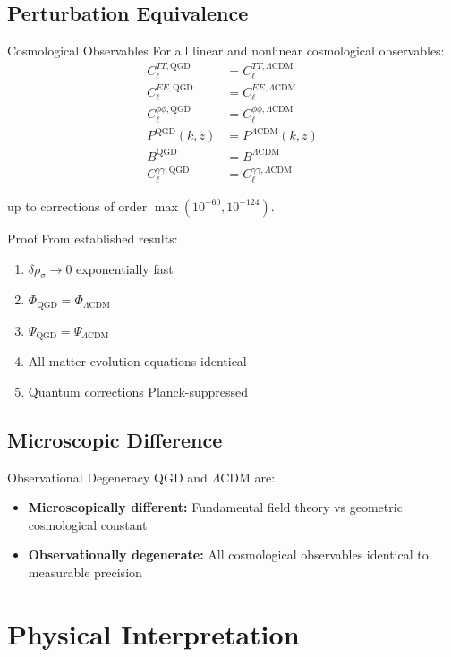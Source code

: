 \documentclass[11pt,a4paper]{article}
\theoremstyle{definition}
\theoremstyle{remark}
\begin{document}
	\subsection{Perturbation Equivalence}
	
	Cosmological Observables
		For all linear and nonlinear cosmological observables:
		\begin{align}
			C_\ell^{TT, \text{QGD}} &= C_\ell^{TT, \Lambda\text{CDM}}\\
			C_\ell^{EE, \text{QGD}} &= C_\ell^{EE, \Lambda\text{CDM}}\\
			C_\ell^{\phi\phi, \text{QGD}} &= C_\ell^{\phi\phi, \Lambda\text{CDM}}\\
			P^{\text{QGD}}(k, z) &= P^{\Lambda\text{CDM}}(k, z)\\
			B^{\text{QGD}} &= B^{\Lambda\text{CDM}}\\
			C_\ell^{\gamma\gamma, \text{QGD}} &= C_\ell^{\gamma\gamma, \Lambda\text{CDM}}
		\end{align}
		
		up to corrections of order $\max(10^{-60}, 10^{-124})$.
	
	Proof
		From established results:
		\begin{enumerate}
			\item $\delta\rho_\sigma \to 0$ exponentially fast
			\item $\Phi_{\text{QGD}} = \Phi_{\Lambda\text{CDM}}$
			\item $\Psi_{\text{QGD}} = \Psi_{\Lambda\text{CDM}}$
			\item All matter evolution equations identical
			\item Quantum corrections Planck-suppressed
		\end{enumerate}
	
	\subsection{Microscopic Difference}
	
	Observational Degeneracy
		QGD and $\Lambda$CDM are:
		\begin{itemize}
			\item \textbf{Microscopically different:} Fundamental field theory vs geometric cosmological constant
			\item \textbf{Observationally degenerate:} All cosmological observables identical to measurable precision
		\end{itemize}
	
	\section{Physical Interpretation}
	
\end{document}
